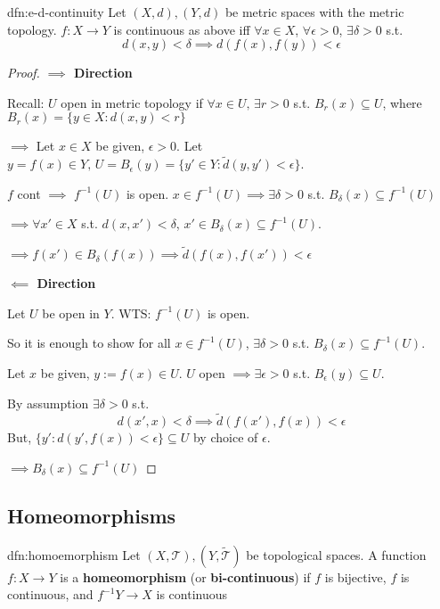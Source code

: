 \documentclass{article}
\begin{document}
\begin{dfn}{dfn:e-d-continuity}{}
    Let $(X, d), (Y, d)$ be metric spaces with the metric topology. $f: X \to Y$ is continuous as above iff $\forall x\in X$, $\forall \epsilon > 0$, $\exists \delta > 0$ s.t.
    \[d(x, y) < \delta \implies d(f(x), f(y)) < \epsilon\]
\end{dfn}

\begin{proof} \textbf{$\implies$ Direction}

    Recall: $U$ open in metric topology if $\forall x\in U,\, \exists r > 0$ s.t. $B_{r}(x) \subseteq U$, where $B_{r}(x) = \{y \in X : d(x, y) < r\}$

    $\implies$ Let $x\in X$ be given, $\epsilon > 0$. Let $y = f(x)\in Y,\, U = B_{\epsilon}(y) = \{y'\in Y : \tilde{d}(y, y') < \epsilon\}$.

    $f$ cont $\implies$ $f^{-1}(U)$ is open. $x\in f^{-1}(U) \implies \exists \delta > 0$ s.t. $B_{\delta}(x) \subseteq f^{-1}(U)$

    $\implies \forall x'\in X$ s.t. $d(x, x') < \delta$, $x'\in B_{\delta}(x) \subseteq f^{-1}(U)$.

    $\implies f(x') \in B_{\delta}(f(x)) \implies \tilde{d}(f(x), f(x')) < \epsilon$

    \textbf{$\impliedby$ Direction}

    Let $U$ be open in $Y$. WTS: $f^{-1}(U)$ is open.

    So it is enough to show for all $x\in f^{-1}(U)$, $\exists \delta > 0$ s.t. $B_{\delta}(x) \subseteq f^{-1}(U)$.

    Let $x$ be given, $y := f(x)\in U$. $U$ open $\implies \exists \epsilon > 0$ s.t. $B_{\epsilon}(y) \subseteq U$.

    By assumption $\exists \delta > 0$ s.t.
    \[d(x', x) < \delta \implies \tilde{d}(f(x'), f(x)) < \epsilon\]
    But, $\{y' : d(y', f(x)) < \epsilon\} \subseteq U$ by choice of $\epsilon$.

    $\implies B_{\delta}(x) \subseteq f^{-1}(U)$
\end{proof}

\subsection{Homeomorphisms}

\begin{dfn}[Homeomorphism]{dfn:homoemorphism}{}
    Let $(X, \mathcal{T}), (Y, \tilde{\mathcal{T}})$ be topological spaces. A function $f : X \to Y$ is a \textbf{homeomorphism} (or \textbf{bi-continuous}) if $f$ is bijective, $f$ is continuous, and $f^{-1} Y \to X$ is continuous
\end{dfn}
\end{document}
